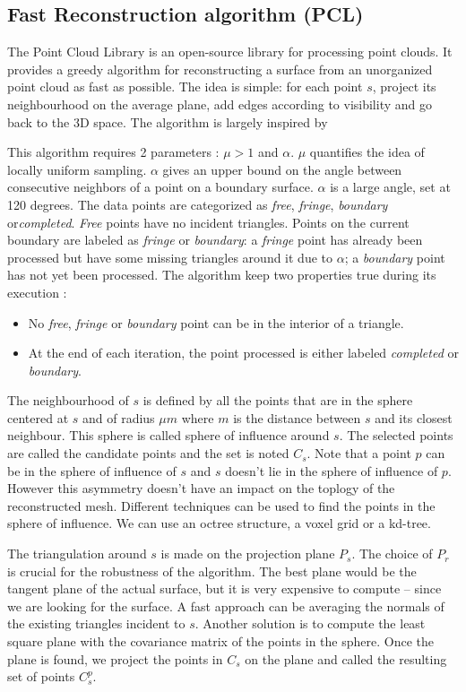 \documentclass[a4paper]{article}
\begin{document}
\subsection{Fast Reconstruction algorithm (PCL)}
The Point Cloud Library is an open-source library for processing point clouds. It provides a greedy algorithm for reconstructing a surface from an unorganized point cloud as fast as possible. The idea is simple: for each point $s$, project its neighbourhood on the average plane, add edges according to visibility and go back to the 3D space. The algorithm is largely inspired by %

This algorithm requires 2 parameters : $\mu > 1$ and $\alpha$. $\mu$ quantifies the idea of locally uniform sampling. $\alpha$ gives an upper bound on the angle between consecutive neighbors of a point on a boundary surface. $\alpha$ is a large angle, set at 120 degrees. The data points are categorized as \textit{free}, \textit{fringe}, \textit{boundary} or\textit{completed}. \textit{Free} points have no incident triangles. Points on the current boundary are labeled as \textit{fringe} or \textit{boundary}: a \textit{fringe} point has already been processed but have some missing triangles around it due to $\alpha$; a \textit{boundary} point has not yet been processed. The algorithm keep two properties true during its execution :
\begin{itemize}
\item No \textit{free}, \textit{fringe} or \textit{boundary} point can be in the interior of a triangle.
\item At the end of each iteration, the point processed is either labeled \textit{completed} or \textit{boundary}.
\end{itemize}

The neighbourhood of $s$ is defined by all the points that are in the sphere centered at $s$ and of radius $\mu m$ where $m$ is the distance between $s$ and its closest neighbour. This sphere is called sphere of influence around $s$. The selected points are called the candidate points and the set is noted $C_s$. Note that a point $p$ can be in the sphere of influence of $s$ and $s$ doesn't lie in the sphere of influence of $p$. However this asymmetry doesn't have an impact on the toplogy of the reconstructed mesh. Different techniques can be used to find the points in the sphere of influence. We can use an octree structure, a voxel grid or a kd-tree.

The triangulation around $s$ is made on the projection plane $P_s$. The choice of $P_r$ is crucial for the robustness of the algorithm. The best plane would be the tangent plane of the actual surface, but it is very expensive to compute -- since we are looking for the surface. A fast approach can be averaging the normals of the existing triangles incident to $s$. Another solution is to compute the least square plane with the covariance matrix of the points in the sphere. Once the plane is found, we project the points in $C_s$ on the plane and called the resulting set of points $C^p_s$.
\end{document}
